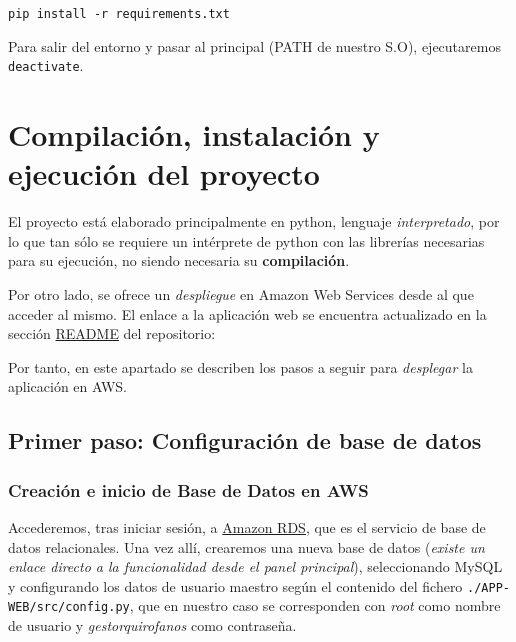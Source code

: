 \texttt{pip install -r requirements.txt}

Para salir del entorno y pasar al principal (PATH de nuestro S.O), ejecutaremos \texttt{deactivate}.


\section{Compilación, instalación y ejecución del proyecto}

El proyecto está elaborado principalmente en python, lenguaje \textit{interpretado}, por lo que tan sólo se requiere un intérprete de python con las librerías necesarias para su ejecución, no siendo necesaria su \textbf{compilación}.

Por otro lado, se ofrece un \textit{despliegue} en Amazon Web Services desde al que acceder al mismo. El enlace a la aplicación web se encuentra actualizado en la sección \href{https://github.com/jesgararm/GestorQuirofanos#readme}{README} del repositorio:


Por tanto, en este apartado se describen los pasos a seguir para \textit{desplegar} la aplicación en AWS.

\subsection{Primer paso: Configuración de base de datos}

\subsubsection{Creación e inicio de Base de Datos en AWS}

Accederemos, tras iniciar sesión, a \href{https://aws.amazon.com/es/rds/}{Amazon RDS}, que es el servicio de base de datos relacionales. Una vez allí, crearemos una nueva base de datos (\textit{existe un enlace directo a la funcionalidad desde el panel principal}), seleccionando MySQL y configurando los datos de usuario maestro según el contenido del fichero \texttt{./APP-WEB/src/config.py}, que en nuestro caso se corresponden con \textit{root} como nombre de usuario y \textit{gestorquirofanos} como contraseña.



